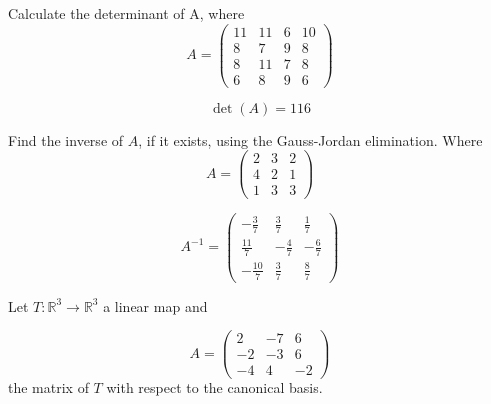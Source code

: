 \begin{questions}

\question Calculate the determinant of A, where
$$
A=\left(\begin{array}{rrrr}
11 & 11 & 6 & 10 \\
8 & 7 & 9 & 8 \\
8 & 11 & 7 & 8 \\
6 & 8 & 9 & 6
\end{array}\right)
$$

\begin{solution}
$$\det(A)=116$$
\end{solution}

\question Find the inverse of $A$, if it exists, using the Gauss-Jordan elimination. Where
$$
A=\left(\begin{array}{rrr}
2 & 3 & 2 \\
4 & 2 & 1 \\
1 & 3 & 3
\end{array}\right)
$$

\begin{solution}
$$A^{-1}=\left(\begin{array}{rrr}
-\frac{3}{7} & \frac{3}{7} & \frac{1}{7} \\
\frac{11}{7} & -\frac{4}{7} & -\frac{6}{7} \\
-\frac{10}{7} & \frac{3}{7} & \frac{8}{7}
\end{array}\right)$$
\end{solution}

\question Let $T:\mathbb{R}^3\rightarrow\mathbb{R}^3$  a linear map and
 
$$
A=\left(\begin{array}{rrr}
2 & -7 & 6 \\
-2 & -3 & 6 \\
-4 & 4 & -2
\end{array}\right)
$$
the matrix of $T$ with respect to the canonical basis.
\end{questions}
